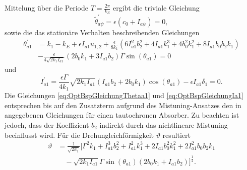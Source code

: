 Mittelung über die Periode $T = \frac{2\pi}{k_E}$ ergibt die triviale Gleichung
\begin{equation}
	\tilde{\theta}_{a \psi}^\prime = \epsilon \left(c_0 + I_{a\psi} \right) = 0,
\end{equation}
%
%
%
%
sowie die das stationäre Verhalten beschreibenden Gleichungen
%
\begin{equation}
	\begin{split}
	\theta_{a1}^\prime &= k_1 - k_E + \epsilon I_{a1} u_{1,2} + \frac{\epsilon}{8  k_1}   \left( 6 I_{a1}^2  b_2^2 + 4 I_{a1} k_1^3 + 4  b_0^2 k_1^2 + 8 I_{a1}  b_0  b_2 k_1 \right)   \\
							&  -   \frac{\epsilon }{4 \sqrt{2 k_1 I_{a1}  } }   \left( 2 b_0 k_1 + 3 I_{a1} b_2  \right)   \Gamma   \sin(\theta_{a1})  = 0
	\end{split}
	\label{eq:OptBspGleichungThetaa1}
\end{equation}
%
und
%
\begin{equation}
	I_{a1}^\prime = \frac{\epsilon  \Gamma }{4 k_1} \sqrt{2 k_1 I_{a1}} \left( I_{a1} b_2 + 2 b_0 k_1 \right)  \cos(\theta_{a1}) 
	- \epsilon I_{a1}  \delta_1  = 0.
		\label{eq:OptBspGleichungIa1}
\end{equation}
%
%
Die Gleichungen \eqref{eq:OptBspGleichungThetaa1} 	und	\eqref{eq:OptBspGleichungIa1} entsprechen bis auf den Zusatzterm aufgrund des Mistuning-Ansatzes 
den in \cite{Mayet:Tautochronic} angegebenen Gleichungen für einen tautochronen Absorber.
Zu beachten ist jedoch, dass der Koeffizient $b_2$ indirekt durch das nichtlineare Mistuning beeinflusst wird.
Für die Drehungleichförmigkeit $\vartheta$ resultiert
\begin{equation}
	\begin{split}
	\vartheta  &= \frac{1}{\sqrt{2 k_1}}   \Bigg[   \Gamma^2 k_1 + I_{a1}^3 b_2^2 + I_{a1}^2 k_1^3 + 2 I_{a1} b_0^2 k_1^2 + 2 I_{a1}^2 b_0 b_2 k_1  \\
						 & \quad-  \sqrt{2 k_1 I_{a1}}  \Gamma  \sin(\theta_{a1})  \left( 2 b_0 k_1  +   I_{a1} b_2 \right)    \Bigg] ^{\frac{1}{2}} .
	\end{split}
	\label{Opt:Bsp:Vartheta}
\end{equation}
















